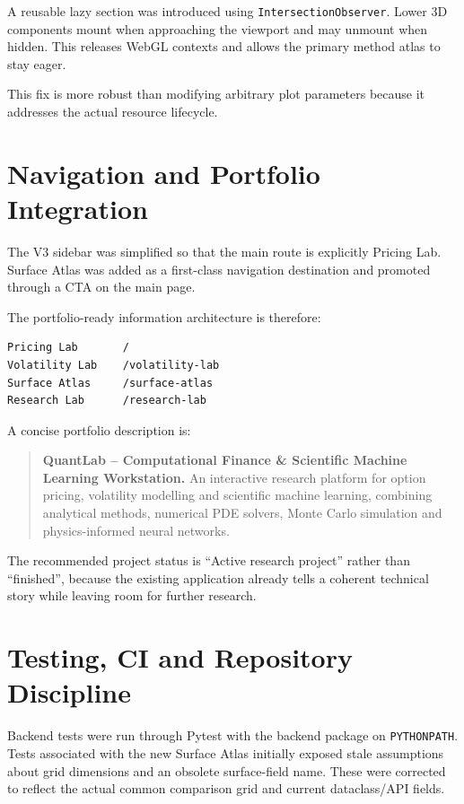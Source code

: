 \documentclass[11pt,a4paper]{article}
\begin{document}
A reusable lazy section was introduced using \texttt{IntersectionObserver}. Lower 3D components mount when approaching the viewport and may unmount when hidden. This releases WebGL contexts and allows the primary method atlas to stay eager.

This fix is more robust than modifying arbitrary plot parameters because it addresses the actual resource lifecycle.

\section{Navigation and Portfolio Integration}

The V3 sidebar was simplified so that the main route is explicitly Pricing Lab. Surface Atlas was added as a first-class navigation destination and promoted through a CTA on the main page.

The portfolio-ready information architecture is therefore:

\begin{lstlisting}
Pricing Lab       /
Volatility Lab    /volatility-lab
Surface Atlas     /surface-atlas
Research Lab      /research-lab
\end{lstlisting}

A concise portfolio description is:

\begin{quote}
\textbf{QuantLab -- Computational Finance \& Scientific Machine Learning Workstation.} An interactive research platform for option pricing, volatility modelling and scientific machine learning, combining analytical methods, numerical PDE solvers, Monte Carlo simulation and physics-informed neural networks.
\end{quote}

The recommended project status is ``Active research project'' rather than ``finished'', because the existing application already tells a coherent technical story while leaving room for further research.

\section{Testing, CI and Repository Discipline}

Backend tests were run through Pytest with the backend package on \texttt{PYTHONPATH}. Tests associated with the new Surface Atlas initially exposed stale assumptions about grid dimensions and an obsolete surface-field name. These were corrected to reflect the actual common comparison grid and current dataclass/API fields.
\end{document}
